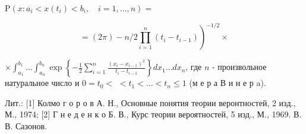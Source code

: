 \documentclass[10pt]{article}
\begin{document}
$\mathrm{P}\left(x: a_{i}<x\left(t_{i}\right)<b_{i}, \quad i=1, \ldots, n\right)=$



\[

\left.=(2 \pi)-n / 2 \prod_{i=1}^{n}\left(t_{i}-t_{i-1}\right)\right)^{-1 / 2} \times

\]



$\times \int_{a_{1}}^{b_{1}} \ldots \int_{a_{n}}^{b_{n}} \exp \left\{-\frac{1}{2} \sum_{i=1}^{n} \frac{\left(x_{i}-x_{i-1}\right)^{2}}{t_{i}-t_{i-1}}\right\} d x_{1} \ldots d x_{n}$, где $n$ - произвольное натуральное число и $0=t_{0}<$ $<t_{1}<\ldots<t_{n} \leqslant 1$ (м е р а В и н е р a).



Лит.: [1] Колмо г о р о в А. Н., Основные понятия теории веронтностей, 2 изд., М., 1974; [2] Г н е д е н к о Б. В., Курс теории вероятностей, 5 изд., М., 1969. В. В. Сазонов.
\end{document}
